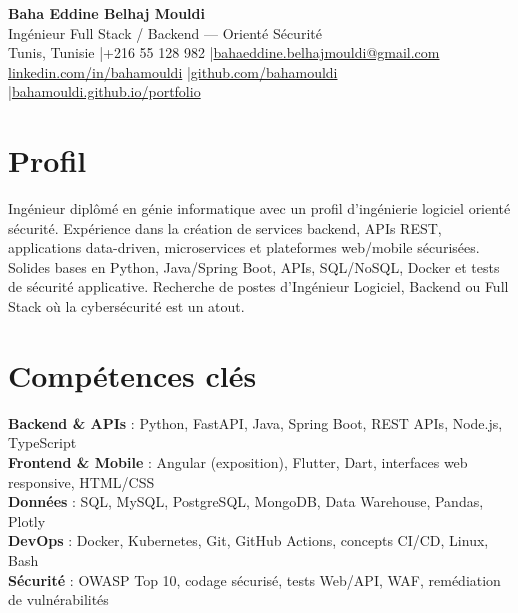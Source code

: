 \documentclass[a4paper,10pt]{article}
\begin{document}
\begin{center}
{\LARGE\bfseries\color{navy} Baha Eddine Belhaj Mouldi}\\[4pt]
{\large Ingénieur Full Stack / Backend — Orienté Sécurité}\\[6pt]
Tunis, Tunisie \quad|\quad +216 55 128 982 \quad|\quad \href{mailto:bahaeddine.belhajmouldi@gmail.com}{bahaeddine.belhajmouldi@gmail.com}\\[2pt]
\href{https://www.linkedin.com/in/bahamouldi}{linkedin.com/in/bahamouldi} \quad|\quad \href{https://github.com/bahamouldi}{github.com/bahamouldi} \quad|\quad \href{https://bahamouldi.github.io/portfolio/}{bahamouldi.github.io/portfolio}
\end{center}
\vspace{3pt}
\section{Profil}
Ingénieur diplômé en génie informatique avec un profil d'ingénierie logiciel orienté sécurité. Expérience dans la création de services backend, APIs REST, applications data-driven, microservices et plateformes web/mobile sécurisées. Solides bases en Python, Java/Spring Boot, APIs, SQL/NoSQL, Docker et tests de sécurité applicative. Recherche de postes d'Ingénieur Logiciel, Backend ou Full Stack où la cybersécurité est un atout.
\section{Compétences clés}
\textbf{Backend \& APIs} : Python, FastAPI, Java, Spring Boot, REST APIs, Node.js, TypeScript\\[1pt]
\textbf{Frontend \& Mobile} : Angular (exposition), Flutter, Dart, interfaces web responsive, HTML/CSS\\[1pt]
\textbf{Données} : SQL, MySQL, PostgreSQL, MongoDB, Data Warehouse, Pandas, Plotly\\[1pt]
\textbf{DevOps} : Docker, Kubernetes, Git, GitHub Actions, concepts CI/CD, Linux, Bash\\[1pt]
\textbf{Sécurité} : OWASP Top 10, codage sécurisé, tests Web/API, WAF, remédiation de vulnérabilités
\end{document}
